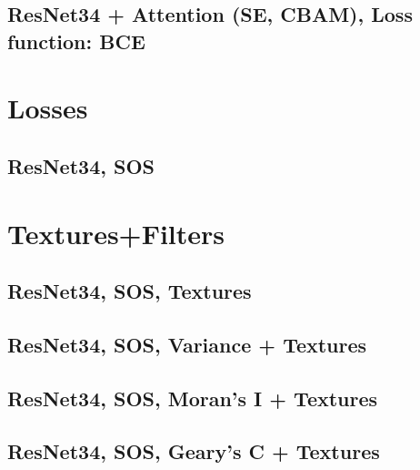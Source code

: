 \documentclass{article}
\begin{document}
\subsection{ResNet34 + Attention (SE, CBAM), Loss function: BCE}


\section{Losses}
\subsection{ResNet34, SOS}


\section{Textures+Filters}
\subsection{ResNet34, SOS, Textures}


\subsection{ResNet34, SOS, Variance + Textures}


\subsection{ResNet34, SOS, Moran's I + Textures}


\subsection{ResNet34, SOS, Geary's C + Textures}

\end{document}
